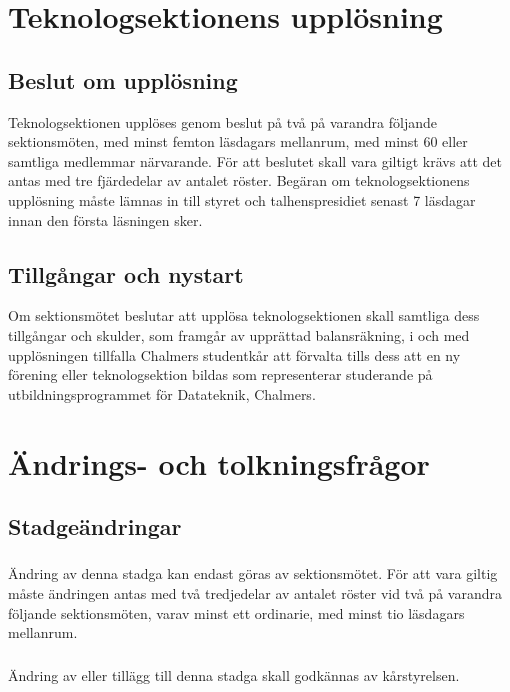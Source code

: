 \documentclass[a4paper]{dtek}
\begin{document}
\section{Teknologsektionens upplösning}
\subsection{Beslut om upplösning}
Teknologsektionen upplöses genom beslut på två på varandra följande sektionsmöten, med minst femton läsdagars mellanrum, med minst 60 eller samtliga medlemmar närvarande. För att beslutet skall vara giltigt krävs att det antas med tre fjärdedelar av antalet röster. Begäran om teknologsektionens upplösning måste lämnas in till styret och talhenspresidiet senast 7 läsdagar innan den första läsningen sker.
\subsection{Tillgångar och nystart}
Om sektionsmötet beslutar att upplösa teknologsektionen skall samtliga dess tillgångar och skulder, som framgår av upprättad balansräkning, i och med upplösningen tillfalla Chalmers studentkår att förvalta tills dess att en ny förening eller teknologsektion bildas som representerar studerande på utbildningsprogrammet för Datateknik, Chalmers.
\newpage

\section{Ändrings- och tolkningsfrågor}
\subsection{Stadgeändringar}
\subsubsection{}
Ändring av denna stadga kan endast göras av sektionsmötet. För att vara giltig måste ändringen antas med två tredjedelar av antalet röster vid två på varandra följande sektionsmöten, varav minst ett ordinarie, med minst tio läsdagars mellanrum.
\subsubsection{}
Ändring av eller tillägg till denna stadga skall godkännas av kårstyrelsen.
\end{document}
